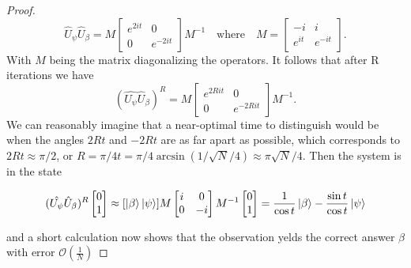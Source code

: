 \begin{proof}
\begin{equation*}
    \hat{U}_\psi\hat{U}_\beta = M  \begin{bmatrix}
    e^{2it} & 0 \\
    0 & e^{-2it}
    \end{bmatrix}  M^{-1} \quad \text{where} \quad M = \begin{bmatrix}
    -i & i \\
    e^{it} & e^{-it}
    \end{bmatrix}.
  \end{equation*}
 With $M$ being the matrix diagonalizing the operators. It follows that after R iterations we have
\begin{equation*}
    (\hat{U_\psi}\hat{U}_\beta)^R = M  \begin{bmatrix}
    e^{2Rit} & 0 \\
    0 & e^{-2Rit}
    \end{bmatrix}  M^{-1}.
\end{equation*}
We can reasonably imagine that a near-optimal time to distinguish would be when the angles $2Rt$ and $-2Rt$ are as far apart as possible, which corresponds to $2Rt \approx \pi/2$, or $R=\pi/4t = \pi/4\arcsin(1/\sqrt{N}/4) \approx \pi \sqrt{N}/4$. Then the system is in the state

\begin{equation*}
    [\ket{\beta} \ket{\psi}]
     (\hat{U_\psi}\hat{U}_\beta)^R \begin{bmatrix}
     0 \\ 1
     \end{bmatrix} \approx 
      [\ket{\beta} \ket{\psi}] M\begin{bmatrix}
      i & 0 \\
      0 & -i
      \end{bmatrix} M^{-1}\begin{bmatrix}
     0 \\ 1
     \end{bmatrix}
    =
    \frac{1}{\cos t}\ket{\beta} - \frac{\sin t}{\cos t}\ket{\psi}
\end{equation*}

and a short calculation now shows that the observation yelds the correct answer $\beta$ with error $\mathcal{O}(\frac{1}{N})$
\end{proof}
